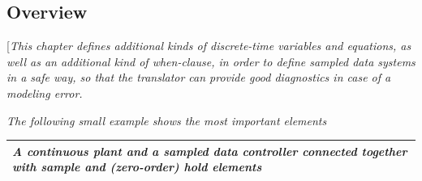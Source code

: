 \documentclass[10pt,a4paper]{report}
\def\doublelabel#1{\label{#1}\hypertarget{#1}{}}
\begin{document}
\subsection{Overview}\doublelabel{overview}

{[}\emph{This chapter defines additional kinds of discrete-time
variables and equations, as well as an additional kind of when-clause,
in order to define sampled data systems in a safe way, so that the
translator can provide good diagnostics in case of a modeling error. }

\emph{The following small example shows the most important elements}

\begin{longtable}[]{@{}l@{}}
\hline
\endhead
\begin{minipage}[t]{0.97\columnwidth}\raggedright
\emph{A continuous plant and a sampled data controller connected
together with sample and (zero-order) hold elements}
\end{minipage}\\ \hline

\end{longtable}
\end{document}
